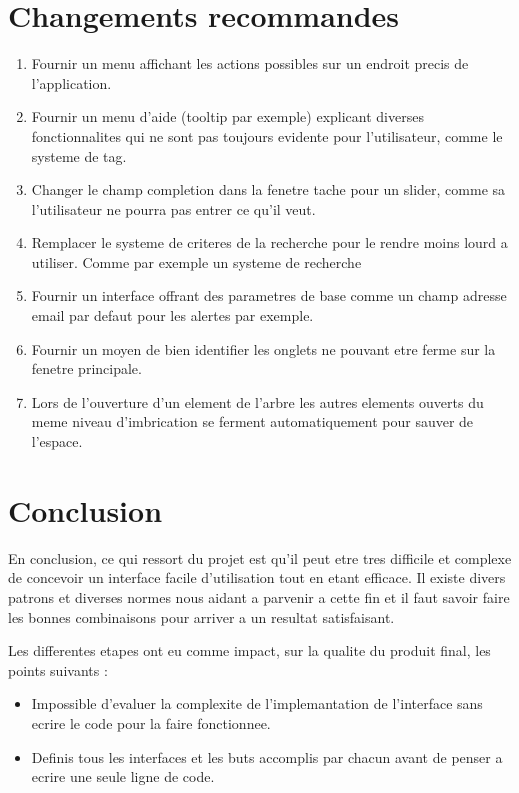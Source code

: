 \documentclass[letterpaper, oneside, 12pt, these, creativecommons]{thETS}
\begin{document}
\chapter{Changements recommandes}

\begin{enumerate}
	\item Fournir un menu affichant les actions possibles sur un endroit precis de l'application.
	\item Fournir un menu d'aide (tooltip par exemple) explicant diverses fonctionnalites qui ne sont pas toujours evidente pour l'utilisateur, comme le systeme de tag.
	\item Changer le champ completion dans la fenetre tache pour un slider, comme sa l'utilisateur ne pourra pas entrer ce qu'il veut.
	\item Remplacer le systeme de criteres de la recherche pour le rendre moins lourd a utiliser. Comme par exemple un systeme de recherche
	\item Fournir un interface offrant des parametres de base comme un champ adresse email par defaut pour les alertes par exemple.
	\item Fournir un moyen de bien identifier les onglets ne pouvant etre ferme sur la fenetre principale.
	\item Lors de l'ouverture d'un element de l'arbre les autres elements ouverts du meme niveau d'imbrication se ferment automatiquement pour sauver de l'espace.
\end{enumerate}

\chapter{Conclusion}

En conclusion, ce qui ressort du projet est qu'il peut etre tres difficile et complexe de concevoir un interface facile d'utilisation tout en etant efficace. Il existe divers patrons et diverses normes nous aidant a parvenir a cette fin et il faut savoir faire les bonnes combinaisons pour arriver a un resultat satisfaisant. 

Les differentes etapes ont eu comme impact, sur la qualite du produit final, les points suivants :

\begin{itemize}
	\item Impossible d'evaluer la complexite de l'implemantation de l'interface sans ecrire le code pour la faire fonctionnee.
	\item Definis tous les interfaces et les buts accomplis par chacun avant de penser a ecrire une seule ligne de code.
\end{itemize}
\end{document}
